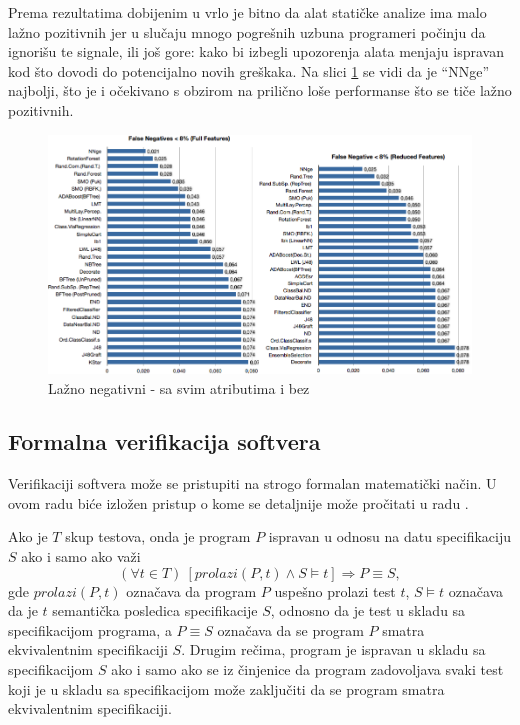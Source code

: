 \documentclass[a4paper]{article}
\theoremstyle{definition}
\begin{document}
{Prema rezultatima dobijenim u  \cite{baca} vrlo je bitno da alat statičke analize ima malo lažno pozitivnih jer
u slučaju mnogo pogrešnih uzbuna programeri počinju da ignorišu te signale, ili još gore: kako bi izbegli upozorenja alata menjaju ispravan kod što dovodi do potencijalno
 novih greškaka. Na slici \ref{fig:falseNeg} se vidi da je ``NNge'' najbolji, što je i očekivano s obzirom na prilično
loše performanse što se tiče lažno pozitivnih.

\begin{figure}[h!]
\centering
\includegraphics[width=\textwidth]{false_negative.png}
\caption{Lažno negativni - sa svim atributima i bez}
\label{fig:falseNeg}
\end{figure}

\subsection{Formalna verifikacija softvera}

\par Verifikaciji softvera može se pristupiti na strogo formalan matematički način. U ovom radu biće izložen pristup o kome se detaljnije može pročitati u radu \cite{verify}.

\par Ako je $T$ skup testova, onda je program $P$ ispravan u odnosu na datu specifikaciju $S$ ako i samo ako važi
$$(\forall t\in T)\ [prolazi(P,t)\wedge S\models t]\Rightarrow P\equiv S,$$
gde $prolazi(P,t)$ označava da program $P$ uspešno prolazi test $t$, $S\models t$ označava da je $t$ semantička posledica specifikacije $S$, odnosno da je test u skladu sa specifikacijom programa, a $P\equiv S$ označava da se program $P$ smatra ekvivalentnim specifikaciji $S$. Drugim rečima, program je ispravan u skladu sa specifikacijom $S$ ako i samo ako se iz činjenice da program zadovoljava svaki test koji je u skladu sa specifikacijom može zaključiti da se program smatra ekvivalentnim specifikaciji.

}
\end{document}
